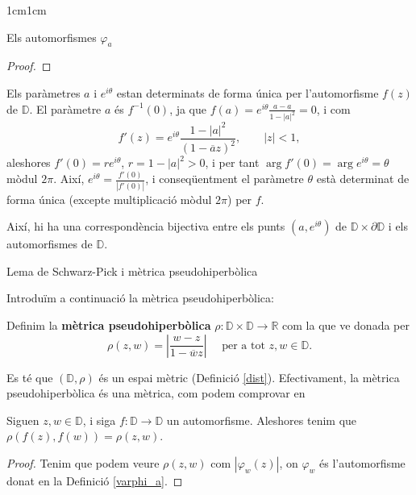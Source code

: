 \begin{adjustwidth}{1cm}{1cm}
\begin{subsection}{Els automorfismes \texorpdfstring{$\varphi_a$}{C}}
\begin{proof}
\end{proof}

\begin{nota}
    Els paràmetres $a$ i $e^{i\theta}$ estan determinats de forma única per l'automorfisme $f(z)$ de $\mathbb{D}$. El paràmetre $a$ és $f^{-1}(0)$, ja que $f(a)=e^{i\theta}\frac{a-a}{1-|a|^2}=0$, i com 
    \[
        f'(z)=e^{i\theta}\frac{1-|a|^2}{(1-\overline{a}z)^2}, \qquad |z|<1,
    \]
    aleshores $f'(0)=re^{i\theta}$, $r=1-|a|^2>0$, i per tant $\operatorname{arg}f'(0)=\operatorname{arg}e^{i\theta}=\theta$ mòdul $2\pi$. Així, $e^{i\theta}=\frac{f'(0)}{|f'(0)|}$, i conseqüentment el paràmetre $\theta$ està determinat de forma única (excepte multiplicació mòdul $2\pi$) per $f$.

    Així, hi ha una correspondència bijectiva entre els punts $(a,e^{i\theta})$ de $\mathbb{D}\times \partial \mathbb{D}$ i els automorfismes de $\mathbb{D}$.
\end{nota}

\end{subsection}

\begin{subsection}{Lema de Schwarz-Pick i mètrica pseudohiperbòlica}

    Introduïm a continuació la mètrica pseudohiperbòlica:

    \begin{definicio}
        Definim la \textbf{mètrica pseudohiperbòlica} $\rho:\mathbb{D}\times \mathbb{D}\to \mathbb{R}$ com la que ve donada per 
        \[
            \rho(z,w)=\left|\frac{w-z}{1-\overline{w}z}\right| \quad \text{ per a tot } z,w\in \mathbb{D}.
        \] 
        \label{pseudohiperbolica}
    \end{definicio}

    \begin{nota}
        Es té que $(\mathbb{D},\rho)$ és un espai mètric (Definició \ref{dist}). Efectivament, la mètrica pseudohiperbòlica és una mètrica, com podem comprovar en \cite[pp. 38-39]{duren}
    \end{nota}

    \begin{proposicio}
        Siguen $z,w\in \mathbb{D}$, i siga $f:\mathbb{D}\to \mathbb{D}$ un automorfisme. Aleshores tenim que $\rho(f(z),f(w))=\rho(z,w)$. 
        \label{prop_pseudohiperbolica}
    \end{proposicio}

    \begin{proof}
        Tenim que podem veure $\rho(z,w)$ com $|\varphi_w(z)|$, on $\varphi_w$ és l'automorfisme donat en la Definició \ref{varphi_a}.
        

\end{proof}
\end{subsection}
\end{adjustwidth}
